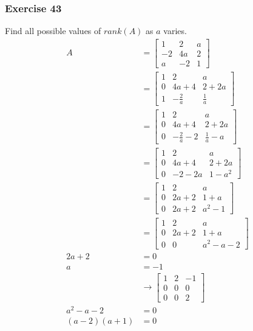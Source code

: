 \documentclass[letterpaper, 12pt]{math}
\begin{document}
\subsubsection*{Exercise 43}
Find all possible values of \( rank(A) \) as \( a \) varies.
\begin{align*}
  A &= \begin{bmatrix}
    1 & 2 & a \\
    -2 & 4a & 2 \\
    a & -2 & 1
  \end{bmatrix} \\
  &= \begin{bmatrix}
    1 & 2 & a \\
    0 & 4a+4 & 2+2a \\
    1 & -\frac{2}{a} & \frac{1}{a}
  \end{bmatrix} \\
  &= \begin{bmatrix}
    1 & 2 & a \\
    0 & 4a+4 & 2+2a \\
    0 & -\frac{2}{a}-2 & \frac{1}{a}-a
  \end{bmatrix} \\
  &= \begin{bmatrix}
    1 & 2 & a \\
    0 & 4a+4 & 2+2a \\
    0 & -2-2a & 1-a^2
  \end{bmatrix} \\
  &= \begin{bmatrix}
    1 & 2 & a \\
    0 & 2a+2 & 1+a \\
    0 & 2a+2 & a^2-1
  \end{bmatrix} \\
  &= \begin{bmatrix}
    1 & 2 & a \\
    0 & 2a+2 & 1+a \\
    0 & 0 & a^2-a-2
  \end{bmatrix} \\
  2a+2 &= 0 \\
  a &= -1 \\
  &\to \begin{bmatrix}
    1 & 2 & -1 \\
    0 & 0 & 0 \\
    0 & 0 & 2
  \end{bmatrix} \\
  a^2-a-2 &= 0 \\
  (a-2)(a+1) &= 0 \\

\end{align*}
\end{document}
